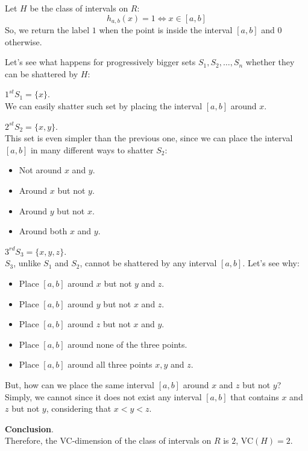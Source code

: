 \begin{example}[title = {Intervals on $\mathbb{R}$}]
    Let $H$ be the class of intervals on $R$:
    $$h_{a, b}(x) = 1 \Leftrightarrow x \in [a, b]$$
    So, we return the label $1$ when the point is inside the interval $[a, b]$ and $0$ otherwise. \vspace{7pt}

    Let's see what happens for progressively bigger sets $S_1, S_2, \dots, S_n$ whether they can be shattered by $H$: \vspace{7pt}

    $1^{st} S_1 = \{x\}$. \\
    We can easily shatter such set by placing the interval $[a, b]$ around $x$. \vspace{3.5pt}

    $2^{st} S_2 = \{x, y\}$. \\
    This set is even simpler than the previous one, since we can place the interval $[a, b]$ in many different ways to shatter $S_2$:
    \begin{itemize}
        \renewcommand{\labelitemi}{-}
        \item Not around $x$ and $y$.
        \item Around $x$ but not $y$.
        \item Around $y$ but not $x$.
        \item Around both $x$ and $y$.
    \end{itemize} \vspace{3.5pt}

    $3^{rd} S_3 = \{x, y, z\}$. \\
    $S_3$, unlike $S_1$ and $S_2$, cannot be shattered by any interval $[a, b]$. Let's see why:
    \begin{itemize}
        \renewcommand{\labelitemi}{-}
        \item Place $[a, b]$ around $x$ but not $y$ and $z$.
        \item Place $[a, b]$ around $y$ but not $x$ and $z$.
        \item Place $[a, b]$ around $z$ but not $x$ and $y$.
        \item Place $[a, b]$ around none of the three points.
        \item Place $[a, b]$ around all three points $x, y$ and $z$.
    \end{itemize}
    But, how can we place the same interval $[a, b]$ around $x$ and $z$ but not $y$? \\ 
    Simply, we cannot since it does not exist any interval $[a, b]$ that contains $x$ and $z$ but not $y$, considering that $x < y < z$. \vspace{7pt}

    \textbf{Conclusion}. \\
    Therefore, the VC-dimension of the class of intervals on $R$ is $2$, VC$(H) = 2$.
\end{example}
